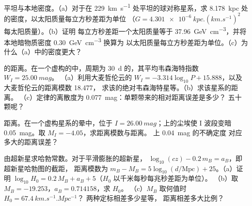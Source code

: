 \begin{exercise}[$\star\star$]\label{exo:b3:milky-way-galaxies:6}
平坦与本地密度。（a）对于在
\qty{229}{km.s^{-1}} 处平坦的球对称星系，求
\qty{8.178}{kpc} 处的密度，以太阳质量每立方秒差距为单位
（$G = \qty{4.301e-6}{kpc.(km.s^{-1})^2}$ 每太阳质量）。（b）证明
每立方秒差距一个太阳质量等于 \qty{37.96}{GeV.cm^{-3}}，并将
本地暗物质密度 \qty{0.30}{GeV.cm^{-3}} 换算为
以太阳质量每立方秒差距为单位。（c）为什么（a）中的密度更大？
\end{exercise}

\begin{exercise}[$\star\star$]\label{exo:b3:milky-way-galaxies:7}
的距离。在一个虚构的中，周期为
\qty{30}{d} 的，其平均韦森海特指数 $W_I = \qty{25.00}{mag}$。
（a）利用大麦哲伦云的
$W_I = -3.314\log_{10}P + 15.888$，以及大麦哲伦云的距离模数 18.477，
求该的绝对韦森海特星等。（b）求该星系的距离。
（c）定律的离散度为 \qty{0.077}{mag}：单颗带来的相对距离误差是多少？
五十颗呢？
\end{exercise}

\begin{exercise}[$\star\star$]\label{exo:b3:milky-way-galaxies:8}
距离。在一个虚构星系的晕中，位于 $I = \qty{26.00}{mag}$；上的尘埃使 I 波段变暗
\qty{0.05}{mag}。取 $M_I = -4.05$，求距离模数与距离。
上 \qty{0.04}{mag} 的不确定度
对应多大的距离误差？
\end{exercise}

\begin{exercise}[$\star\star$]\label{exo:b3:milky-way-galaxies:9}
由超新星求哈勃常数。对于平滑膨胀的超新星，
$\log_{10}(cz) - 0.2\,m_B = a_B$，即超新星哈勃图的截距，
距离模数为
$m_B - M_B = 5\log_{10}(d/\mathrm{Mpc}) + 25$。（a）证明
$\log_{10}H_0 = 0.2\,M_B + a_B + 5$（$H_0$ 以千米每秒每兆秒差距为单位）。
（b）取 $M_B = -19.253$，$a_B = 0.714158$，求 $H_0$。
（c）$M_B$ 取何值时 $H_0 = \qty{67.4}{km.s^{-1}.Mpc^{-1}}$？
两种定标相差多少星等，
距离相差多大比例？
\end{exercise}

